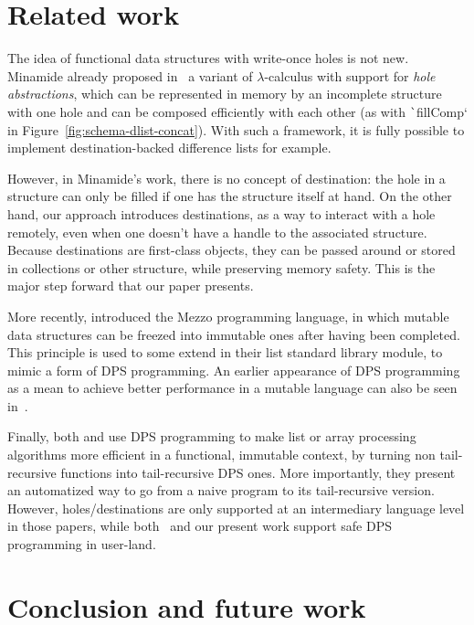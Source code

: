\documentclass[english]{jflart}
\begin{document}
\section{Related work}

The idea of functional data structures with write-once holes is not new. Minamide already proposed in~\cite{minamide_functional_1998} a variant of $\lambda$-calculus with support for \emph{hole abstractions}, which can be represented in memory by an incomplete structure with one hole and can be composed efficiently with each other (as with \texttt`fillComp` in Figure~\ref{fig:schema-dlist-concat}). With such a framework, it is fully possible to implement destination-backed difference lists for example.

However, in Minamide's work, there is no concept of destination: the hole in a structure can only be filled if one has the structure itself at hand. On the other hand, our approach introduces destinations, as a way to interact with a hole remotely, even when one doesn't have a handle to the associated structure. Because destinations are first-class objects, they can be passed around or stored in collections or other structure, while preserving memory safety. This is the major step forward that our paper presents.

More recently, \cite{protzenko_mezzo_2013} introduced the Mezzo programming language, in which mutable data structures can be freezed into immutable ones after having been completed. This principle is used to some extend in their list standard library module, to mimic a form of DPS programming. An earlier appearance of DPS programming as a mean to achieve better performance in a mutable language can also be seen in~\cite{larus_restructuring_1989}.

Finally, both \cite{shaikhha_destination-passing_2017} and \cite{bour_tmc_2021} use DPS programming to make list or array processing algorithms more efficient in a functional, immutable context, by turning non tail-recursive functions into tail-recursive DPS ones. More importantly, they present an automatized way to go from a naive program to its tail-recursive version. However, holes/destinations are only supported at an intermediary language level in those papers, while both~\cite{minamide_functional_1998} and our present work support safe DPS programming in user-land.

\section{Conclusion and future work}
\end{document}
